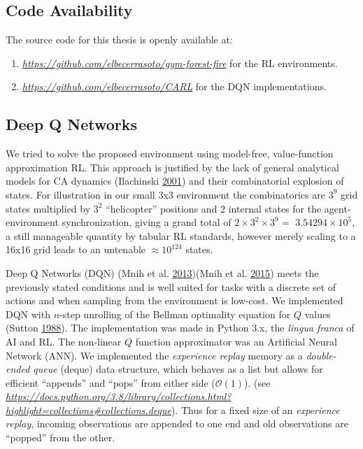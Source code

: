 \documentclass[
  openany]{book}
\providecommand{\tightlist}{%
  \setlength{\itemsep}{0pt}\setlength{\parskip}{0pt}}
\begin{document}
\hypertarget{code-availability}{%
\subsection{Code Availability}\label{code-availability}}

The source code for this thesis is openly available at:

\begin{enumerate}
\def\labelenumi{\arabic{enumi}.}
\tightlist
\item
  \emph{\url{https://github.com/elbecerrasoto/gym-forest-fire}} for the RL environments.
\item
  \emph{\url{https://github.com/elbecerrasoto/CARL}} for the DQN implementations.
\end{enumerate}

\hypertarget{deep-q-networks-1}{%
\subsection{Deep Q Networks}\label{deep-q-networks-1}}

We tried to solve the proposed environment using model-free, value-function approximation RL. This approach is justified by the lack of general analytical models for CA dynamics (Ilachinski \protect\hyperlink{ref-ilachinski2001cellular}{2001}) and their combinatorial explosion of states. For illustration in our small 3x3 environment the combinatorics are \(3^9\) grid states multiplied by \(3^2\) ``helicopter'' positions and \(2\) internal states for the agent-environment synchronization, giving a grand total of \(2 \times 3^2 \times 3^9 =\) \ensuremath{3.54294\times 10^{5}}, a still manageable quantity by tabular RL standards, however merely scaling to a 16x16 grid leads to an untenable \(\approx 10^{124}\) states.

Deep Q Networks (DQN) (Mnih et al. \protect\hyperlink{ref-mnih2013playing}{2013})(Mnih et al. \protect\hyperlink{ref-mnih2015human}{2015}) meets the previously stated conditions and is well suited for tasks with a discrete set of actions and when sampling from the environment is low-cost. We implemented DQN with \(n\)-step unrolling of the Bellman optimality equation for \(Q\) values (Sutton \protect\hyperlink{ref-sutton1988learning}{1988}). The implementation was made in Python 3.x, the \emph{lingua franca} of AI and RL. The non-linear \(Q\) function approximator was an Artificial Neural Network (ANN). We implemented the \emph{experience replay} memory as a \emph{double-ended queue} (deque) data structure, which behaves as a list but allows for efficient ``appends'' and ``pops'' from either side (\(\mathcal{O}(1)\)). (see \emph{\url{https://docs.python.org/3.8/library/collections.html?highlight=collections\#collections.deque}}). Thus for a fixed size of an \emph{experience replay}, incoming observations are appended to one end and old observations are ``popped'' from the other.
\end{document}
